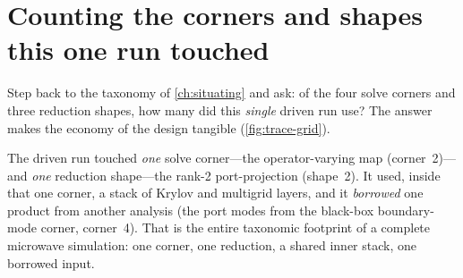 \section{Counting the corners and shapes this one run touched}
\label{sec:trace-count}

Step back to the taxonomy of \cref{ch:situating} and ask: of the four solve
corners and three reduction shapes, how many did this \emph{single} driven run
use? The answer makes the economy of the design tangible (\cref{fig:trace-grid}).

The driven run touched \emph{one} solve corner---the operator-varying map
(corner~2)---and \emph{one} reduction shape---the rank-2 port-projection (shape~2).
It used, inside that one corner, a stack of Krylov and multigrid layers, and it
\emph{borrowed} one product from another analysis (the port modes from the
black-box boundary-mode corner, corner~4). That is the entire taxonomic footprint
of a complete microwave simulation: one corner, one reduction, a shared inner
stack, one borrowed input.

